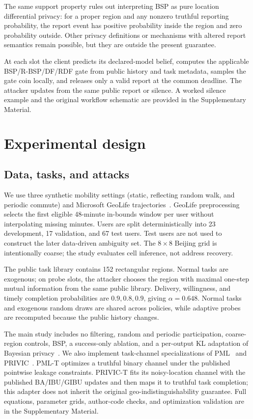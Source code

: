 \documentclass[review,11pt,times]{elsarticle}
\begin{document}
The same support property rules out interpreting BSP as pure location differential privacy: for a proper region and any nonzero truthful reporting probability, the report event has positive probability inside the region and zero probability outside. Other privacy definitions or mechanisms with altered report semantics remain possible, but they are outside the present guarantee.

At each slot the client predicts its declared-model belief, computes the applicable BSP/R-BSP/DF/RDF gate from public history and task metadata, samples the gate coin locally, and releases only a valid report at the common deadline. The attacker updates from the same public report or silence. A worked silence example and the original workflow schematic are provided in the Supplementary Material.

\section{Experimental design}
\label{sec:experiments}
\subsection{Data, tasks, and attacks}
We use three synthetic mobility settings (static, reflecting random walk, and periodic commute) and Microsoft GeoLife trajectories~\cite{geolife2008,geolife2009,geolife2010}. GeoLife preprocessing selects the first eligible 48-minute in-bounds window per user without interpolating missing minutes. Users are split deterministically into 23 development, 17 validation, and 67 test users. Test users are not used to construct the later data-driven ambiguity set. The \(8\times8\) Beijing grid is intentionally coarse; the study evaluates cell inference, not address recovery.

The public task library contains 152 rectangular regions. Normal tasks are exogenous; on probe slots, the attacker chooses the region with maximal one-step mutual information from the same public library. Delivery, willingness, and timely completion probabilities are \(0.9,0.8,0.9\), giving \(\alpha=0.648\). Normal tasks and exogenous random draws are shared across policies, while adaptive probes are recomputed because the public history changes.

The main study includes no filtering, random and periodic participation, coarse-region controls, BSP, a success-only ablation, and a per-output KL adaptation of Bayesian privacy~\cite{bayesian}. We also implement task-channel specializations of PML~\cite{pml2024} and PRIVIC~\cite{privic2024}. PML-T optimizes a truthful binary channel under the published pointwise leakage constraints. PRIVIC-T fits its noisy-location channel with the published BA/IBU/GIBU updates and then maps it to truthful task completion; this adapter does not inherit the original geo-indistinguishability guarantee. Full equations, parameter grids, author-code checks, and optimization validation are in the Supplementary Material.
\end{document}
